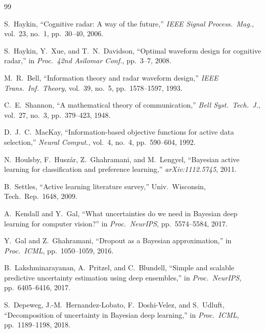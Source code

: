 \documentclass[12pt, a4paper]{article}
\theoremstyle{definition}
\begin{document}
\newpage

\begin{thebibliography}{99}

S.~Haykin,
``Cognitive radar: A way of the future,''
\emph{IEEE Signal Process.\ Mag.}, vol.~23, no.~1, pp.~30--40, 2006.

S.~Haykin, Y.~Xue, and T.~N.~Davidson,
``Optimal waveform design for cognitive radar,''
in \emph{Proc.\ 42nd Asilomar Conf.}, pp.~3--7, 2008.

M.~R.~Bell,
``Information theory and radar waveform design,''
\emph{IEEE Trans.\ Inf.\ Theory}, vol.~39, no.~5, pp.~1578--1597, 1993.

C.~E.~Shannon,
``A mathematical theory of communication,''
\emph{Bell Syst.\ Tech.\ J.}, vol.~27, no.~3, pp.~379--423, 1948.

D.~J.~C.~MacKay,
``Information-based objective functions for active data selection,''
\emph{Neural Comput.}, vol.~4, no.~4, pp.~590--604, 1992.

N.~Houlsby, F.~Husz\'{a}r, Z.~Ghahramani, and M.~Lengyel,
``Bayesian active learning for classification and preference learning,''
\emph{arXiv:1112.5745}, 2011.

B.~Settles,
``Active learning literature survey,''
Univ.\ Wisconsin, Tech.\ Rep.\ 1648, 2009.

A.~Kendall and Y.~Gal,
``What uncertainties do we need in Bayesian deep learning for computer vision?''
in \emph{Proc.\ NeurIPS}, pp.~5574--5584, 2017.

Y.~Gal and Z.~Ghahramani,
``Dropout as a Bayesian approximation,''
in \emph{Proc.\ ICML}, pp.~1050--1059, 2016.

B.~Lakshminarayanan, A.~Pritzel, and C.~Blundell,
``Simple and scalable predictive uncertainty estimation using deep ensembles,''
in \emph{Proc.\ NeurIPS}, pp.~6405--6416, 2017.

S.~Depeweg, J.-M.~Hernandez-Lobato, F.~Doshi-Velez, and S.~Udluft,
``Decomposition of uncertainty in Bayesian deep learning,''
in \emph{Proc.\ ICML}, pp.~1189--1198, 2018.


\end{thebibliography}
\end{document}
